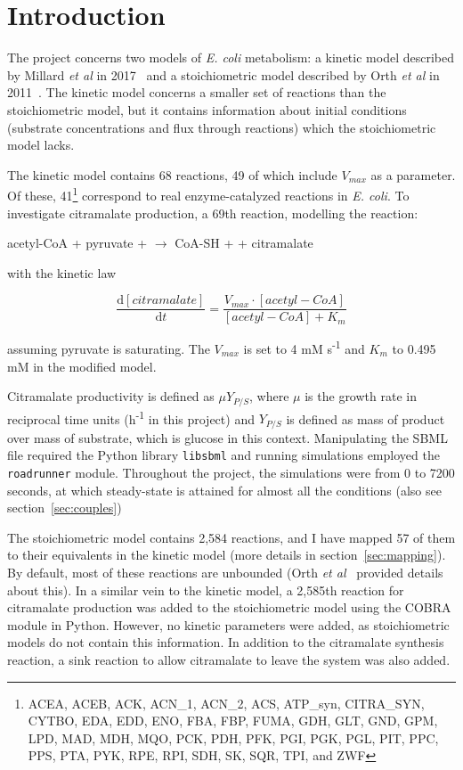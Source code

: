 \documentclass[parskip=full]{scrreprt}
\begin{document}
\chapter*{Introduction}
\label{ch:intro}

The project concerns two models of \emph{E. coli} metabolism: a kinetic model described by Millard \emph{et al} in 2017~\cite{millard_metabolic_2017} and a stoichiometric model described by Orth \emph{et al} in 2011~\cite{orth_comprehensive_2011}. The kinetic model concerns a smaller set of reactions than the stoichiometric model, but it contains information about initial conditions (substrate concentrations and flux through reactions) which the stoichiometric model lacks.

The kinetic model contains 68 reactions, 49 of which include $V_{max}$ as a parameter. Of these, 41\footnote{ACEA, ACEB, ACK, ACN\_1, ACN\_2, ACS, ATP\_syn, CITRA\_SYN, CYTBO, EDA, EDD, ENO, FBA, FBP, FUMA, GDH, GLT, GND, GPM, LPD, MAD, MDH, MQO, PCK, PDH, PFK, PGI, PGK, PGL, PIT, PPC, PPS, PTA, PYK, RPE, RPI, SDH, SK, SQR, TPI, and ZWF} correspond to real enzyme-catalyzed reactions in \emph{E. coli}. To investigate citramalate production, a 69th reaction, modelling the reaction:

\begin{center}
  acetyl-CoA + pyruvate +  $\rightarrow$ CoA-SH +  + citramalate
\end{center}

with the kinetic law

\[
  \frac{\mathrm{d}[citramalate]}{\mathrm{d}t} = 
  \frac{V_{max} \cdot [acetyl-CoA]}{[acetyl-CoA] + K_{m}}
\]

assuming pyruvate is saturating. The $V_{max}$ is set to 4 mM s\textsuperscript{-1} and $K_{m}$ to 0.495 mM in the modified model.

Citramalate productivity is defined as $\mu Y_{P/S}$, where $\mu$ is the growth rate in reciprocal time units (h\textsuperscript{-1} in this project) and $Y_{P/S}$ is defined as mass of product over mass of substrate, which is glucose in this context. Manipulating the SBML file required the Python library \texttt{libsbml} and running simulations employed the \texttt{roadrunner} module. Throughout the project, the simulations were from 0 to 7200 seconds, at which steady-state is attained for almost all the conditions (also see section~\vref{sec:couples}) %

The stoichiometric model contains 2,584 reactions, and I have mapped 57 of them to their equivalents in the kinetic model (more details in section~\vref{sec:mapping}). By default, most of these reactions are unbounded (Orth \emph{et al}~\cite{orth_comprehensive_2011} provided details about this). In a similar vein to the kinetic model, a 2,585th reaction for citramalate production was added to the stoichiometric model using the COBRA module in Python. However, no kinetic parameters were added, as stoichiometric models do not contain this information. In addition to the citramalate synthesis reaction, a sink reaction to allow citramalate to leave the system was also added.
\end{document}
